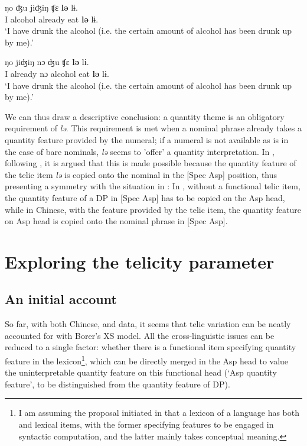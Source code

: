 \documentclass[output=paper]{langsci/langscibook}
\begin{document}
\begin{exe}
    \ex {}
\sn \gll ŋo ʤu {jiʤiŋ} {ʧε} \textbf{lə} lɨ. \\
    I alcohol already eat \textbf{lə} lɨ. \\
    \glt \enquote*{I have drunk the alcohol (i.e. the certain amount of alcohol has been drunk up by me).}
\end{exe}

\begin{exe}
    \ex {}
\sn \gll ŋo {jiʤiŋ} {nɔ} ʤu {ʧε} \textbf{lə} lɨ. \\
    I already {nɔ} alcohol eat \textbf{lə} lɨ. \\
    \glt \enquote*{I have drunk the alcohol (i.e. the certain amount of alcohol has been drunk up by me).}
\end{exe}

We can thus draw a descriptive conclusion: a quantity theme is an obligatory
requirement of \emph{lə}. This requirement is met when a nominal phrase already
takes a quantity feature provided by the numeral; if a numeral is not available
as is in the case of bare nominals, \emph{lə} seems to 'offer' a quantity
interpretation. In \textcite{Huxuhui2016}, following \textcite{Borer2005b}, it
is argued that this is made possible because the quantity feature of the telic
item \emph{lə} is copied onto the nominal in the [Spec Asp] position,
thus presenting a symmetry with the situation in : In , without a
functional telic item, the quantity feature of a DP in [Spec Asp] has to
be copied on the Asp head, while in Chinese, with the feature provided
by the telic item, the quantity feature on Asp head is copied onto the
nominal phrase in [Spec Asp].

\section{Exploring the telicity parameter}
\subsection{An initial account}

So far, with both Chinese,  and  data, it seems that
telic variation can be neatly accounted for with Borer's XS model. All the
cross-linguistic issues can be reduced to a single factor: whether there is a
functional item specifying quantity feature in the lexicon\footnote{I am
    assuming the proposal initiated in 
    \citep[cf.][]{HalleMarantz1993,marantz2007phases} that a lexicon of a
    language has both  and lexical items, with the former
    specifying features to be engaged in syntactic computation, and the latter
mainly takes conceptual meaning.}, which can be directly merged in the
Asp head to value the uninterpretable quantity feature on this
functional head (`Asp quantity feature', to be
distinguished from the quantity feature of DP).
\end{document}
